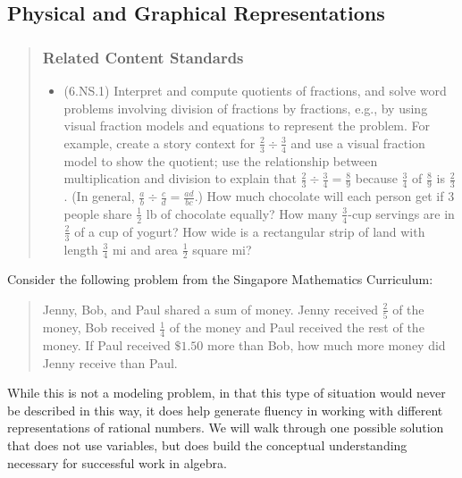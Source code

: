 \documentclass[
]{book}
\providecommand{\tightlist}{%
  \setlength{\itemsep}{0pt}\setlength{\parskip}{0pt}}
\theoremstyle{definition}
\theoremstyle{definition}
\theoremstyle{definition}
\theoremstyle{remark}
\begin{document}
\hypertarget{physical-and-graphical-representations}{%
\subsection{Physical and Graphical Representations}\label{physical-and-graphical-representations}}

\begin{quote}
\hypertarget{related-content-standards-13}{%
\subsubsection*{Related Content Standards}\label{related-content-standards-13}}

\begin{itemize}
\tightlist
\item
  (6.NS.1) Interpret and compute quotients of fractions, and solve word problems involving division of fractions by fractions, e.g., by using visual fraction models and equations to represent the problem. For example, create a story context for \(\frac{2}{3} \div \frac{3}{4}\) and use a visual fraction model to show the quotient; use the relationship between multiplication and division to explain that \(\frac{2}{3} \div \frac{3}{4} = \frac{8}{9}\) because \(\frac{3}{4}\) of \(\frac{8}{9}\) is \(\frac{2}{3}\). (In general, \(\frac{a}{b} \div \frac{c}{d} = \frac{ad}{bc}\).) How much chocolate will each person get if 3 people share \(\frac{1}{2}\) lb of chocolate equally? How many \(\frac{3}{4}\)-cup servings are in \(\frac{2}{3}\) of a cup of yogurt? How wide is a rectangular strip of land with length \(\frac{3}{4}\) mi and area \(\frac{1}{2}\) square mi?
\end{itemize}
\end{quote}

Consider the following problem from the Singapore Mathematics Curriculum:

\begin{quote}
Jenny, Bob, and Paul shared a sum of money. Jenny received \(\frac{2}{5}\) of the money, Bob received \(\frac{1}{4}\) of the money and Paul received the rest of the money. If Paul received \(\$1.50\) more than Bob, how much more money did Jenny receive than Paul.
\end{quote}

While this is not a modeling problem, in that this type of situation would never be described in this way, it does help generate fluency in working with different representations of rational numbers. We will walk through one possible solution that does not use variables, but does build the conceptual understanding necessary for successful work in algebra.
\end{document}
